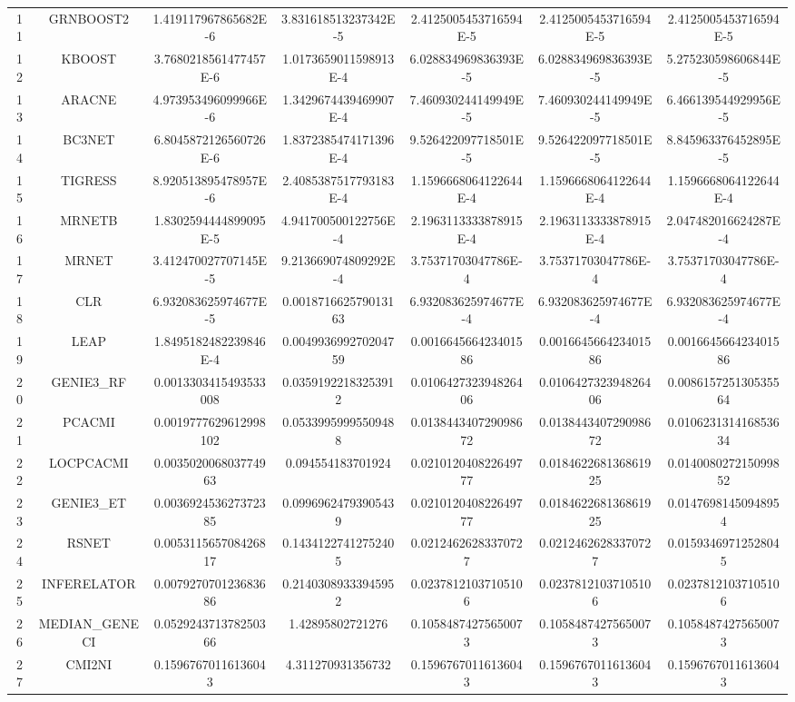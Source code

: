 \documentclass[a4paper,10pt]{article}
\begin{document}
\begin{landscape}
\begin{table}[!htp]
\begin{tabular}{ccccccc}
11&GRNBOOST2&1.419117967865682E-6&3.831618513237342E-5&2.4125005453716594E-5&2.4125005453716594E-5&2.4125005453716594E-5\\
12&KBOOST&3.7680218561477457E-6&1.0173659011598913E-4&6.028834969836393E-5&6.028834969836393E-5&5.275230598606844E-5\\
13&ARACNE&4.973953496099966E-6&1.3429674439469907E-4&7.460930244149949E-5&7.460930244149949E-5&6.466139544929956E-5\\
14&BC3NET&6.8045872126560726E-6&1.8372385474171396E-4&9.526422097718501E-5&9.526422097718501E-5&8.845963376452895E-5\\
15&TIGRESS&8.920513895478957E-6&2.4085387517793183E-4&1.1596668064122644E-4&1.1596668064122644E-4&1.1596668064122644E-4\\
16&MRNETB&1.8302594444899095E-5&4.941700500122756E-4&2.1963113333878915E-4&2.1963113333878915E-4&2.047482016624287E-4\\
17&MRNET&3.412470027707145E-5&9.213669074809292E-4&3.75371703047786E-4&3.75371703047786E-4&3.75371703047786E-4\\
18&CLR&6.932083625974677E-5&0.001871662579013163&6.932083625974677E-4&6.932083625974677E-4&6.932083625974677E-4\\
19&LEAP&1.8495182482239846E-4&0.004993699270204759&0.001664566423401586&0.001664566423401586&0.001664566423401586\\
20&GENIE3_RF&0.0013303415493533008&0.03591922183253912&0.010642732394826406&0.010642732394826406&0.008615725130535564\\
21&PCACMI&0.0019777629612998102&0.05339959995509488&0.013844340729098672&0.013844340729098672&0.010623131416853634\\
22&LOCPCACMI&0.003502006803774963&0.094554183701924&0.021012040822649777&0.018462268136861925&0.014008027215099852\\
23&GENIE3_ET&0.003692453627372385&0.09969624793905439&0.021012040822649777&0.018462268136861925&0.01476981450948954\\
24&RSNET&0.005311565708426817&0.14341227412752405&0.02124626283370727&0.02124626283370727&0.01593469712528045\\
25&INFERELATOR&0.007927070123683686&0.21403089333945952&0.02378121037105106&0.02378121037105106&0.02378121037105106\\
26&MEDIAN_GENECI&0.052924371378250366&1.42895802721276&0.10584874275650073&0.10584874275650073&0.10584874275650073\\
27&CMI2NI&0.15967670116136043&4.311270931356732&0.15967670116136043&0.15967670116136043&0.15967670116136043\\
\hline
\end{tabular}
\end{table}


\end{landscape}
\end{document}
